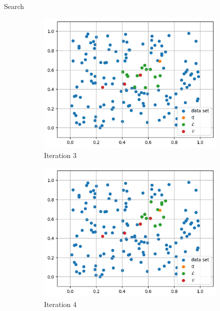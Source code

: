 {Search}
    \begin{figure}[h]
        \centering
        \hfill
        \begin{subfigure}{0.31\textwidth}
            \includegraphics[width=\textwidth]{images/greedy-search-3}
            \caption{Iteration 3}
        \end{subfigure}
        \hfill
        \begin{subfigure}{0.31\textwidth}
            \includegraphics[width=\textwidth]{images/greedy-search-4}
            \caption{Iteration 4}
        \end{subfigure}
        \hfill
        \begin{subfigure}{0.31\textwidth}

\end{subfigure}
\end{figure}
